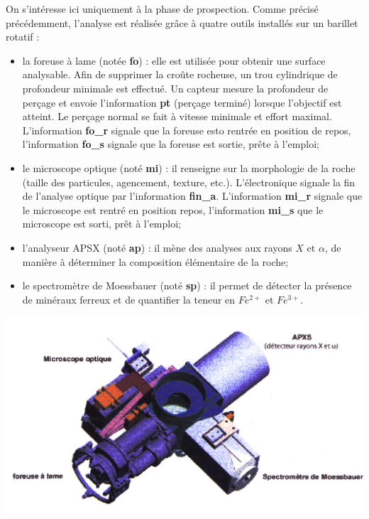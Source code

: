 \documentclass[10pt,fleqn]{article} %
\begin{document}
\begin{multicols}{2}
\begin{multicols}{2}
On s’intéresse ici uniquement à la phase de prospection. Comme précisé précédemment, l’analyse est réalisée grâce à quatre outils installés sur un barillet rotatif :
\begin{itemize}
\item la foreuse à lame (notée \textbf{fo}) : elle est utilisée pour obtenir une surface analysable. Afin de supprimer la croûte rocheuse, un trou cylindrique de profondeur minimale est effectué. Un capteur mesure la profondeur de perçage et envoie l’information \textbf{pt} (perçage terminé) lorsque l’objectif est atteint. Le perçage normal se fait à vitesse minimale et effort maximal. L’information \textbf{fo\_r} signale que la foreuse esto rentrée en position de repos, l’information \textbf{fo\_s} signale que la foreuse est sortie, prête à l’emploi;
\item le microscope optique (noté \textbf{mi}) : il renseigne sur la morphologie de la roche (taille des particules, agencement, texture, etc.). L’électronique signale la fin de l’analyse optique par l’information \textbf{fin\_a}. L’information \textbf{mi\_r} signale que le microscope est rentré en position repos, l’information \textbf{mi\_s} que le microscope est sorti, prêt à l’emploi;
\item l’analyseur APSX (noté \textbf{ap}) : il mène des analyses aux rayons $X$ et $\alpha$, de manière à déterminer la composition élémentaire de la roche;
\item le spectromètre de Moessbauer (noté \textbf{sp}) : il permet de détecter la présence de minéraux ferreux et de quantifier la teneur en $Fe^{2+}$ et $Fe^{3+}$.
\end{itemize}


\begin{center}
\includegraphics[width=\linewidth]{images/fig_05.png}
\end{center}


\end{multicols}
\end{multicols}
\end{document}
